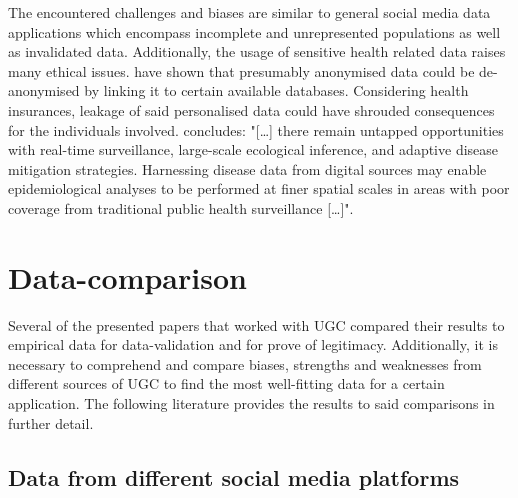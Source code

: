 The encountered challenges and biases are similar to general social media data applications which encompass incomplete and unrepresented populations as well as invalidated data. Additionally, the usage of sensitive health related data raises many ethical issues. \textcite{DeMontjoye2013} have shown that presumably anonymised data could be de-anonymised by linking it to certain available databases. Considering health insurances, leakage of said personalised data could have shrouded consequences for the individuals involved.  
\textcite[p.410]{Lee2016} concludes: "[\dots] there remain untapped opportunities with real-time surveillance, large-scale ecological inference, and adaptive disease mitigation strategies. Harnessing disease data from digital sources may enable epidemiological analyses to be performed at finer spatial scales in areas with poor coverage from traditional public health surveillance [\dots]".

\section{Data-comparison} \label{data_comparison_SotA}
Several of the presented papers that worked with UGC compared their results to empirical data for data-validation and for prove of legitimacy. Additionally, it is necessary to comprehend and compare biases, strengths and weaknesses from different sources of UGC to find the most well-fitting data for a certain application. The following literature provides the results to said comparisons in further detail.

\subsection{Data from different social media platforms} \label{SMP_vs_SMP}

